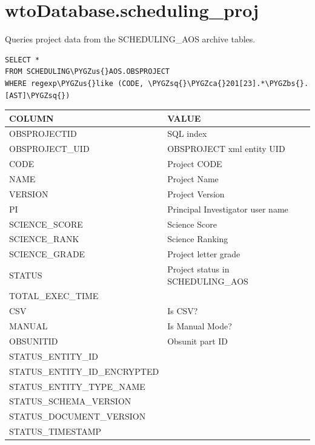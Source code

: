 \documentclass[a4paper,10pt,english]{sphinxmanual}
\def\PYGZbs{\char`\\}
\def\PYGZus{\char`\_}
\def\PYGZca{\char`\^}
\def\PYGZsq{\char`\'}
\renewcommand\PYGZsq{\textquotesingle}
\begin{document}
\section{wtoDatabase.scheduling\_proj}
\label{wtodata:wtodatabase-scheduling-proj}
Queries project data from the SCHEDULING\_AOS archive tables.

\begin{Verbatim}[commandchars=\\\{\}]
SELECT *
FROM SCHEDULING\PYGZus{}AOS.OBSPROJECT
WHERE regexp\PYGZus{}like (CODE, \PYGZsq{}\PYGZca{}201[23].*\PYGZbs{}.[AST]\PYGZsq{})
\end{Verbatim}

\begin{tabulary}{\linewidth}{|L|L|}
\hline
\textsf{\relax 
COLUMN
} & \textsf{\relax 
VALUE
}\\
\hline
OBSPROJECTID
 & 
SQL index
\\

OBSPROJECT\_UID
 & 
OBSPROJECT xml entity UID
\\

CODE
 & 
Project CODE
\\

NAME
 & 
Project Name
\\

VERSION
 & 
Project Version
\\

PI
 & 
Principal Investigator user name
\\

SCIENCE\_SCORE
 & 
Science Score
\\

SCIENCE\_RANK
 & 
Science Ranking
\\

SCIENCE\_GRADE
 & 
Project letter grade
\\

STATUS
 & 
Project status in SCHEDULING\_AOS
\\

TOTAL\_EXEC\_TIME
 & \\

CSV
 & 
Is CSV?
\\

MANUAL
 & 
Is Manual Mode?
\\

OBSUNITID
 & 
Obsunit part ID
\\

STATUS\_ENTITY\_ID
 & \\

STATUS\_ENTITY\_ID\_ENCRYPTED
 & \\

STATUS\_ENTITY\_TYPE\_NAME
 & \\

STATUS\_SCHEMA\_VERSION
 & \\

STATUS\_DOCUMENT\_VERSION
 & \\

STATUS\_TIMESTAMP
 & \\
\hline\end{tabulary}
\end{document}
